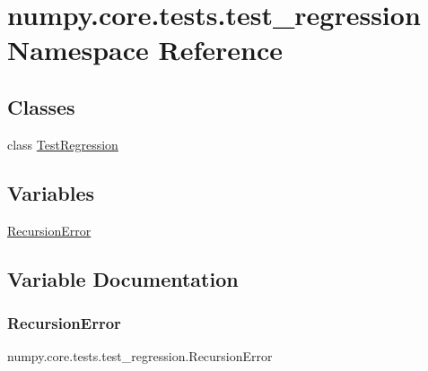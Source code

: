 \hypertarget{namespacenumpy_1_1core_1_1tests_1_1test__regression}{}\section{numpy.\+core.\+tests.\+test\+\_\+regression Namespace Reference}
\label{namespacenumpy_1_1core_1_1tests_1_1test__regression}
\subsection*{Classes}
\begin{DoxyCompactItemize}
\item 
class \hyperlink{classnumpy_1_1core_1_1tests_1_1test__regression_1_1TestRegression}{Test\+Regression}
\end{DoxyCompactItemize}
\subsection*{Variables}
\begin{DoxyCompactItemize}
\item 
\hyperlink{namespacenumpy_1_1core_1_1tests_1_1test__regression_af34ae40751d07f8ce1113e1efedd9ca5}{Recursion\+Error}
\end{DoxyCompactItemize}


\subsection{Variable Documentation}
\mbox{\label{namespacenumpy_1_1core_1_1tests_1_1test__regression_af34ae40751d07f8ce1113e1efedd9ca5}} 
\subsubsection{\texorpdfstring{Recursion\+Error}{RecursionError}}
{\footnotesize\ttfamily numpy.\+core.\+tests.\+test\+\_\+regression.\+Recursion\+Error}

